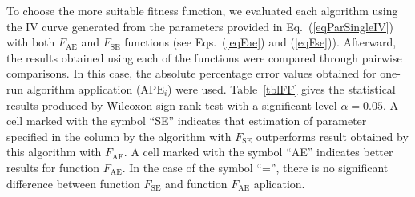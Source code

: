 \documentclass[a4paper,fleqn]{cas-sc}
\begin{document}
To choose the more suitable fitness function, we evaluated each algorithm using the IV curve generated from the parameters
provided in Eq.~(\ref{eqParSingleIV}) with both $F_\mathrm{AE}$ and $F_\mathrm{SE}$ functions (see Eqs.~(\ref{eqFae}) and (\ref{eqFse})).
Afterward, the results obtained using each of the functions were compared through pairwise comparisons.
In this case, the absolute percentage error values obtained for one-run algorithm application ($\mathrm{APE}_i$) were used.
Table~\ref{tblFF} gives the statistical results produced by Wilcoxon sign-rank test with a significant level $\alpha = 0.05$.
A cell marked with the symbol ``SE'' indicates that estimation of parameter specified in the column by the algorithm with $F_\mathrm{SE}$ outperforms result obtained by this  algorithm with $F_\mathrm{AE}$.
A cell marked with the symbol ``AE'' indicates better results for function $F_\mathrm{AE}$.
In the case of the symbol ``='', there is no significant difference between function $F_\mathrm{SE}$ and function $F_\mathrm{AE}$ aplication.
\end{document}
